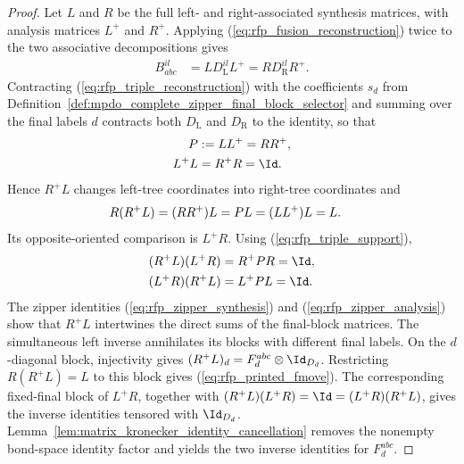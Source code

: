 \begin{proof}\leanok
    Let $L$ and $R$ be the full left- and right-associated synthesis matrices,
    with analysis matrices $L^+$ and $R^+$. Applying
    (\ref{eq:rfp_fusion_reconstruction}) twice to the two associative
    decompositions gives
    \begin{align}
        B_{abc}^{il}
         & =L D_{\mathrm L}^{il}L^+
        =R D_{\mathrm R}^{il}R^+.
        \label{eq:rfp_triple_reconstruction}
    \end{align}
    Contracting (\ref{eq:rfp_triple_reconstruction}) with the coefficients
    $s_d$ from
    Definition~\ref{def:mpdo_complete_zipper_final_block_selector} and summing
    over the final labels $d$ contracts both $D_{\mathrm L}$ and
    $D_{\mathrm R}$ to the identity, so that
    \begin{align}
        P    & :=LL^+=RR^+,
        \label{eq:rfp_triple_support} \\
        L^+L & =R^+R=\Id. \notag
    \end{align}
    Hence $R^+L$ changes left-tree coordinates into right-tree coordinates and
    \begin{align}
        R(R^+L)
         & =(RR^+)L=PL=(LL^+)L=L. \notag
    \end{align}
    Its opposite-oriented comparison is $L^+R$. Using
    (\ref{eq:rfp_triple_support}),
    \begin{align}
        (R^+L)(L^+R) & =R^+PR=\Id, \notag \\
        (L^+R)(R^+L) & =L^+PL=\Id. \notag
    \end{align}
    The zipper identities (\ref{eq:rfp_zipper_synthesis}) and
    (\ref{eq:rfp_zipper_analysis}) show that $R^+L$ intertwines the direct
    sums of the final-block matrices. The simultaneous left inverse
    annihilates its blocks with different final labels. On the
    $d$-diagonal block, injectivity gives
    $(R^+L)_d=F^{abc}_d\otimes\Id_{D_d}$.
    Restricting $R(R^+L)=L$ to this block gives
    (\ref{eq:rfp_printed_fmove}).
    The corresponding fixed-final block of $L^+R$, together with
    $(R^+L)(L^+R)=\Id=(L^+R)(R^+L)$, gives the inverse identities
    tensored with $\Id_{D_d}$.
    Lemma~\ref{lem:matrix_kronecker_identity_cancellation} removes the
    nonempty bond-space identity factor and yields the two inverse identities
    for $F^{abc}_d$.
\end{proof}

